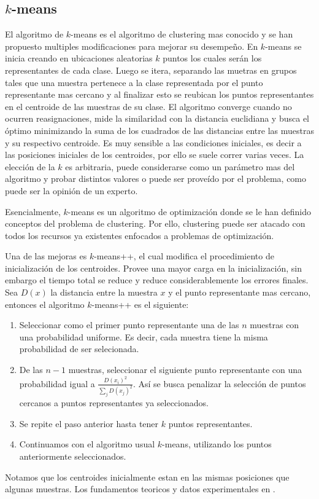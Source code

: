 \documentclass[10pt,a4paper]{article}
\begin{document}
\subsection{$k$-means}
El algoritmo de $k$-means es el algoritmo de clustering mas conocido y se han propuesto multiples modificaciones para mejorar su desempeño. %
En $k$-means se inicia creando en ubicaciones aleatorias $k$ puntos los cuales serán los representantes de cada clase. Luego se itera, separando las muetras en grupos tales que una muestra pertenece a la clase representada por el punto representante mas cercano y al finalizar esto se reubican los puntos representantes en el centroide de las muestras de su clase. El algoritmo converge cuando no ocurren reasignaciones, mide la similaridad con la distancia euclidiana y busca el óptimo minimizando la suma de los cuadrados de las distancias entre las muestras y su respectivo centroide. Es muy sensible a las condiciones iniciales, es decir a las posiciones iniciales de los centroides, por ello se suele correr varias veces. La elección de la $k$ es arbitraria, puede considerarse como un parámetro mas del algoritmo y probar distintos valores o puede ser proveído por el problema, como puede ser la opinión de un experto.

Esencialmente, $k$-means es un algoritmo de optimización donde se le han definido conceptos del problema de clustering. Por ello, clustering puede ser atacado con todos los recursos ya existentes enfocados a problemas de optimización.

Una de las mejoras es $k$-means++, el cual modifica el procedimiento de inicialización de los centroides. Provee una mayor carga en la inicialización, sin embargo el tiempo total se reduce y reduce considerablemente los errores finales. Sea $D(x)$ la distancia entre la muestra $x$ y el punto representante mas cercano, entonces el algoritmo $k$-means++ es el siguiente:
\begin{enumerate}
\item Seleccionar como el primer punto representante una de las $n$ muestras con una probabilidad uniforme. Es decir, cada muestra tiene la misma probabilidad de ser selecionada.
\item De las $n-1$ muestras, seleccionar el siguiente punto representante con una probabilidad igual a $\frac{D(x_i)^2}{\sum_j D(x_j)^2}$. Así se busca penalizar la selección de puntos cercanos a puntos representantes ya seleccionados.
\item Se repite el paso anterior hasta tener $k$ puntos representantes.
\item Continuamos con el algoritmo usual $k$-means, utilizando los puntos anteriormente seleccionados.
\end{enumerate}
Notamos que los centroides inicialmente estan en las mismas posiciones que algunas muestras. Los fundamentos teoricos y datos experimentales en \cite{arthur2007k}.
\end{document}
